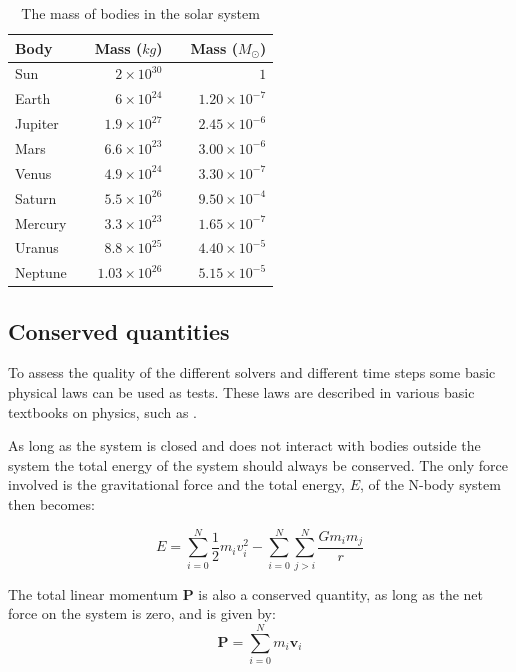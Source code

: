 \documentclass{article}
\begin{document}
\begin{table}[h]
\centering
\caption{The mass of bodies in the solar system}
\label{tab:mass}
\begin{tabularx}{\textwidth}{X X r X r}
\hline
Body    && Mass ($kg$) & & Mass ($M_{\odot}$) \\
\hline\hline
Sun     && $2\times 10^{30}$   && $1$ \\
Earth   && $6\times 10^{24}$   && $1.20\times 10^{-7}$ \\
Jupiter && $1.9\times 10^{27}$ && $2.45\times 10^{-6}$ \\
Mars    && $6.6\times 10^{23}$ && $3.00\times 10^{-6}$ \\
Venus   && $4.9\times 10^{24}$ && $3.30\times 10^{-7}$ \\
Saturn  && $5.5\times 10^{26}$ && $9.50\times 10^{-4}$ \\
Mercury && $3.3\times 10^{23}$ && $1.65\times 10^{-7}$ \\
Uranus  && $8.8\times 10^{25}$ && $4.40\times 10^{-5}$ \\
Neptune && $1.03\times 10^{26}$&& $5.15\times 10^{-5}$ \\
\hline
\end{tabularx}
\end{table}


\subsection{Conserved quantities}
To assess the quality of the different solvers and different time steps some basic physical laws can be used as tests. These laws are described in various basic textbooks on physics, such as \cite{physics}.

As long as the system is closed and does not interact with bodies outside the system the total energy of the system should always be conserved. The only force involved is the gravitational force and the total energy, $E$, of the N-body system then becomes:

\begin{equation}
E = \sum\limits_{i=0}^N\frac{1}{2}m_iv_i^2 - \sum\limits_{i=0}^N\sum_{j>i}^N \frac{Gm_im_j}{r}
\label{eq:energy}
\end{equation}

The total linear momentum $\bm{P}$ is also a conserved quantity, as long as the net force on the system is zero, and is given by:
\begin{equation}
\bm{P} = \sum\limits_{i=0}^Nm_i\bm{v}_i
\end{equation}
\end{document}
